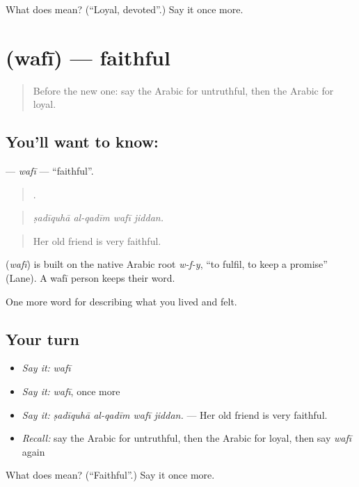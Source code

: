 \begin{tcolorbox}[breakable,colback=teal!4,colframe=teal!35!black,title={Before you move on}]
What does  mean? (\textquotedblleft{}Loyal, devoted\textquotedblright{}.) Say it once more.
\end{tcolorbox}
\section[\texorpdfstring{\ar{وفي} (wafī)}{وفي (wafī)}]{ (wafī) — faithful}

\label{lesson:AR-C499-wafi}



\begin{quote}
Before the new one: say the Arabic for untruthful, then the Arabic for loyal.
\end{quote}

\subsection*{You'll want to know: }
\textbf{} — \emph{wafī} — \textquotedblleft{}faithful\textquotedblright{}.

\begin{quote}
   .
\end{quote}

\begin{quote}
\emph{ṣadīquhā al-qadīm wafī jiddan.}
\end{quote}

\begin{quote}
Her old friend is very faithful.
\end{quote}

\begin{cousinweb}
\textbf{} (\emph{wafī}) is built on the native Arabic root \emph{w-f-y}, \textquotedblleft{}to fulfil, to keep a promise\textquotedblright{} (Lane). A wafī person keeps their word.
\end{cousinweb}

\begin{grammarlens}[title={What you've built}]
One more word for describing what you lived and felt.
\end{grammarlens}

\subsection*{Your turn}
\begin{itemize}
\raggedright
  \item \emph{Say it:} \emph{wafī}
  \item \emph{Say it:} \emph{wafī}, once more
  \item \emph{Say it:} \emph{ṣadīquhā al-qadīm wafī jiddan.} — Her old friend is very faithful.
  \item \emph{Recall:} say the Arabic for untruthful, then the Arabic for loyal, then say \emph{wafī} again
\end{itemize}

\begin{tcolorbox}[breakable,colback=teal!4,colframe=teal!35!black,title={Before you move on}]
What does  mean? (\textquotedblleft{}Faithful\textquotedblright{}.) Say it once more.
\end{tcolorbox}
